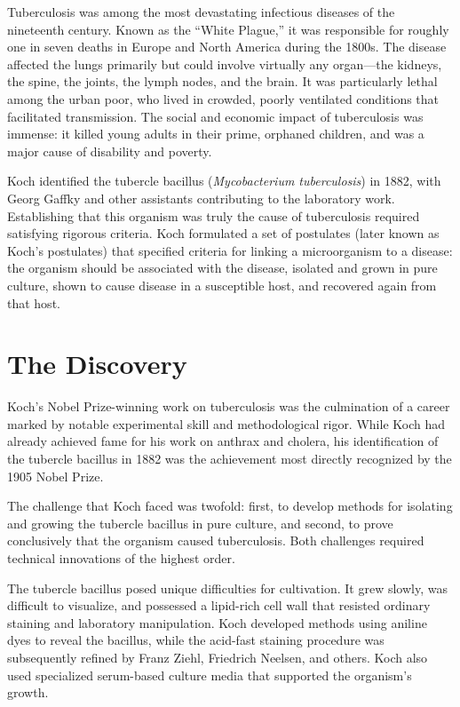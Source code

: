 Tuberculosis was among the most devastating infectious diseases of the nineteenth century. Known as the ``White Plague,'' it was responsible for roughly one in seven deaths in Europe and North America during the 1800s. The disease affected the lungs primarily but could involve virtually any organ---the kidneys, the spine, the joints, the lymph nodes, and the brain. It was particularly lethal among the urban poor, who lived in crowded, poorly ventilated conditions that facilitated transmission. The social and economic impact of tuberculosis was immense: it killed young adults in their prime, orphaned children, and was a major cause of disability and poverty.

Koch identified the tubercle bacillus (\emph{Mycobacterium tuberculosis}) in 1882, with Georg Gaffky and other assistants contributing to the laboratory work. Establishing that this organism was truly the cause of tuberculosis required satisfying rigorous criteria. Koch formulated a set of postulates (later known as Koch's postulates) that specified criteria for linking a microorganism to a disease: the organism should be associated with the disease, isolated and grown in pure culture, shown to cause disease in a susceptible host, and recovered again from that host.

\section{The Discovery}

Koch's Nobel Prize-winning work on tuberculosis was the culmination of a career marked by notable experimental skill and methodological rigor. While Koch had already achieved fame for his work on anthrax and cholera, his identification of the tubercle bacillus in 1882 was the achievement most directly recognized by the 1905 Nobel Prize.

The challenge that Koch faced was twofold: first, to develop methods for isolating and growing the tubercle bacillus in pure culture, and second, to prove conclusively that the organism caused tuberculosis. Both challenges required technical innovations of the highest order.

The tubercle bacillus posed unique difficulties for cultivation. It grew slowly, was difficult to visualize, and possessed a lipid-rich cell wall that resisted ordinary staining and laboratory manipulation. Koch developed methods using aniline dyes to reveal the bacillus, while the acid-fast staining procedure was subsequently refined by Franz Ziehl, Friedrich Neelsen, and others. Koch also used specialized serum-based culture media that supported the organism's growth.

